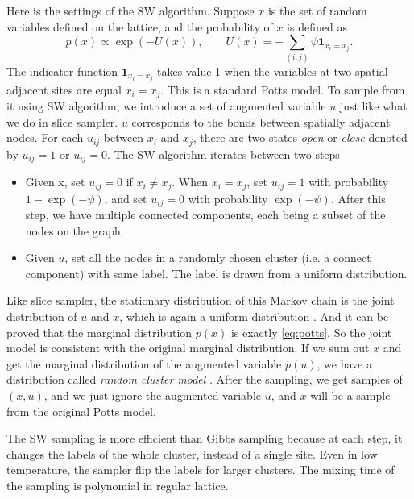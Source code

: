 \documentclass[12pt]{article}
\begin{document}
Here is the settings of the SW algorithm. Suppose $x$ is the set of random
variables defined on the lattice, and the probability of $x$ is defined as
\begin{equation}
p(x) \propto \exp (-U(x)), \qquad U(x) = - \sum_{(i,j)} \psi \mathbf{1}_{x_i = x_j}.\label{eq:potts}
\end{equation}
The indicator function $\mathbf{1}_{x_i = x_j}$ takes value 1 when the variables
at two spatial adjacent sites are equal $x_i = x_j$. This is a standard Potts
model. To sample from it using SW algorithm, we introduce a set of augmented
variable $u$ just like what we do in slice sampler. $u$ corresponds to the bonds
between spatially adjacent nodes. For each $u_{ij}$ between $x_i$ and $x_j$,
there are two states \emph{open} or \emph{close} denoted by $u_{ij} = 1$ or
$u_{ij} = 0$. The SW algorithm iterates between two steps
\begin{itemize}
  \item Given x, set $u_{ij} = 0$ if $x_i \neq x_j$. When $x_i = x_j$, set
    $u_{ij} = 1$ with probability $1 - \exp (-\psi)$, and set $u_{ij} = 0$ with
    probability $\exp(-\psi)$. After this step, we have multiple connected
    components, each being a subset of the nodes on the graph.
  \item Given $u$, set all the nodes in a randomly chosen cluster (i.e. a
    connect component) with same label. The label is drawn from a uniform
    distribution.
\end{itemize}
Like slice sampler, the stationary distribution of this Markov chain is the
joint distribution of $u$ and $x$, which is again a uniform distribution
\citep[ch. 6.5.2]{rubinstein2008simulation}. And it can be proved
\citep[ch. 8.2]{winkler2003image} that the marginal distribution $p(x)$ is
exactly \eqref{eq:potts}. So the joint model is consistent with the original
marginal distribution. If we sum out $x$ and get the marginal distribution of
the augmented variable $p(u)$, we have a distribution called \emph{random
  cluster model} \cite[ch. 8]{grimmett2006random}. After the sampling, we get
samples of $(x,u)$, and we just ignore the augmented variable $u$, and $x$ will
be a sample from the original Potts model.

The SW sampling is more efficient than Gibbs sampling because at each step, it
changes the labels of the whole cluster, instead of a single site. Even in low
temperature, the sampler flip the labels for larger clusters. The mixing time of
the sampling is polynomial in regular lattice.
\end{document}
